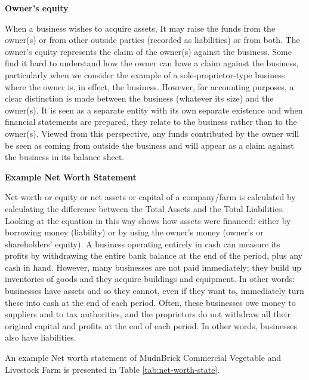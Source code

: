\documentclass[11pt,]{book}
\theoremstyle{definition}
\theoremstyle{definition}
\theoremstyle{definition}
\theoremstyle{remark}
\begin{document}
\textbf{Owner's equity}

When a business wishes to acquire assets, It may raise the funds from
the owner(s) or from other outside parties (recorded as liabilities) or
from both. The owner's equity represents the claim of the owner(s)
against the business. Some find it hard to understand how the owner can
have a claim against the business, particularly when we consider the
example of a sole-proprietor-type business where the owner is, in
effect, the business. However, for accounting purposes, a clear
distinction is made between the business (whatever its size) and the
owner(s). It is seen as a separate entity with its own separate
existence and when financial statements are prepared, they relate to the
business rather than to the owner(s). Viewed from this perspective, any
funds contributed by the owner will be seen as coming from outside the
business and will appear as a claim against the business in its balance
sheet.

\textbf{Example Net Worth Statement}

Net worth or equity or net assets or capital of a company/farm is
calculated by calculating the difference between the Total Assets and
the Total Liabilities. Looking at the equation in this way shows how
assets were financed: either by borrowing money (liability) or by using
the owner's money (owner's or shareholders' equity). A business
operating entirely in cash can measure its profits by withdrawing the
entire bank balance at the end of the period, plus any cash in hand.
However, many businesses are not paid immediately; they build up
inventories of goods and they acquire buildings and equipment. In other
words: businesses have assets and so they cannot, even if they want to,
immediately turn these into cash at the end of each period. Often, these
businesses owe money to suppliers and to tax authorities, and the
proprietors do not withdraw all their original capital and profits at
the end of each period. In other words, businesses also have
liabilities.

An example Net worth statement of MudnBrick Commercial Vegetable and
Livestock Farm is presented in Table \ref{tab:net-worth-state}.

\end{document}
